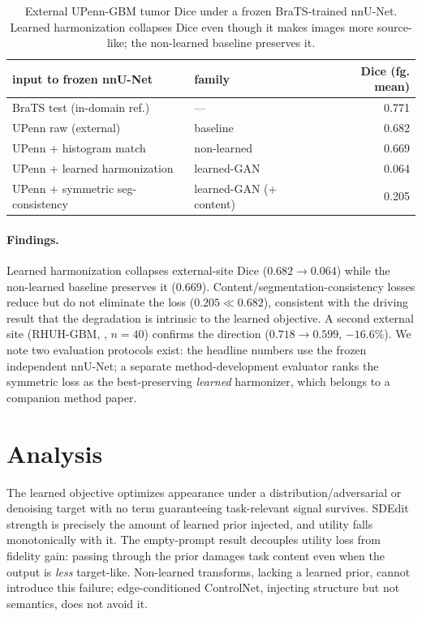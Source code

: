 \documentclass{article}
\begin{document}
\begin{table}[t]
\centering
\caption{External UPenn-GBM tumor Dice under a frozen BraTS-trained nnU-Net.
Learned harmonization collapses Dice even though it makes images more source-like;
the non-learned baseline preserves it.}
\label{tab:medical}
\begin{tabular}{llr}
\toprule
input to frozen nnU-Net & family & Dice (fg. mean) \\
\midrule
BraTS test (in-domain ref.) & --- & 0.771 \\
UPenn raw (external) & baseline & 0.682 \\
UPenn + histogram match & non-learned & 0.669 \\
UPenn + learned harmonization & learned-GAN & 0.064 \\
UPenn + symmetric seg-consistency & learned-GAN (+ content) & 0.205 \\
\bottomrule
\end{tabular}
\end{table}

\paragraph{Findings.} Learned harmonization collapses external-site Dice
($0.682{\rightarrow}0.064$) while the non-learned baseline preserves it ($0.669$).
Content/segmentation-consistency losses reduce but do not eliminate the loss
($0.205 \ll 0.682$), consistent with the driving result that the degradation is
intrinsic to the learned objective. A second external site (RHUH-GBM,
\citealp{cardoso2022rhuh}, $n{=}40$) confirms the direction
($0.718{\rightarrow}0.599$, $-16.6\%$). We note two evaluation protocols exist: the
headline numbers use the frozen independent nnU-Net; a separate
method-development evaluator ranks the symmetric loss as the best-preserving
\emph{learned} harmonizer, which belongs to a companion method paper.

\section{Analysis}
The learned objective optimizes appearance under a distribution/adversarial or
denoising target with no term guaranteeing task-relevant signal survives. SDEdit
strength is precisely the amount of learned prior injected, and utility falls
monotonically with it. The empty-prompt result decouples utility loss from fidelity
gain: passing through the prior damages task content even when the output is
\emph{less} target-like. Non-learned transforms, lacking a learned prior, cannot
introduce this failure; edge-conditioned ControlNet, injecting structure but not
semantics, does not avoid it.
\end{document}
